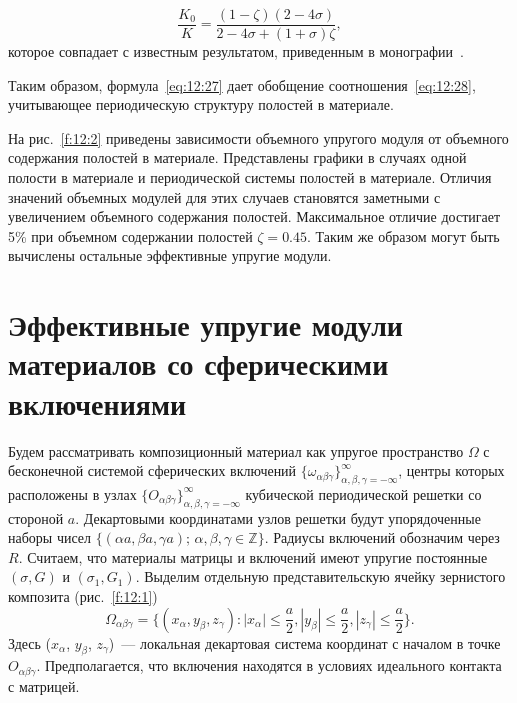 \begin{equation}
\frac{K_0}{K}=\frac{(1-\zeta)(2-4\sigma)}{2-4\sigma+(1+\sigma)\zeta},
\label{eq:12:28}
\end{equation}  
которое совпадает с известным результатом, приведенным в монографии~\cite{Vanin1985}.

Таким образом, формула~\eqref{eq:12:27} дает обобщение соотношения~\eqref{eq:12:28}, учитывающее периодическую структуру полостей в материале.

На рис.~\ref{f:12:2} приведены зависимости объемного упругого модуля от объемного содержания полостей в материале. Представлены графики в случаях одной полости в материале и периодической системы полостей в материале. Отличия значений объемных модулей для этих случаев становятся заметными с увеличением объемного содержания полостей. Максимальное отличие достигает 5\% при объемном содержании полостей $\zeta=0.45$. Таким же образом могут быть вычислены остальные эффективные упругие модули.


\section[Эффективные упругие модули материалов со сферическими включениями]{Эффективные упругие модули материалов со сферическими включениями}

Будем рассматривать композиционный материал как упругое пространство $\Omega$ с бесконечной системой сферических включений $\{\omega_{\alpha\beta\gamma}\}_{\alpha,\beta,\gamma=-\infty}^\infty$, центры которых расположены в узлах $\{O_{\alpha\beta\gamma}\}_{\alpha,\beta,\gamma=-\infty}^\infty$ кубической периодической решетки со стороной $a$. Декартовыми координатами узлов решетки будут упорядоченные наборы чисел $\{(\alpha a,\beta a,\gamma a);\,\alpha,\beta,\gamma\in\mathbb{Z}\}$. Радиусы включений обозначим через $R$. Считаем, что материалы матрицы и включений имеют упругие постоянные $(\sigma, G)$ и $(\sigma_1, G_1)$. Выделим отдельную представительскую ячейку зернистого композита (рис.~\ref{f:12:1})
$$
\Omega_{\alpha\beta\gamma}=\bigg\{(x_\alpha,y_\beta,z_\gamma): |x_\alpha|\le\dfrac{a}{2},|y_\beta|\le\dfrac{a}{2},|z_\gamma|\le\dfrac{a}{2}\bigg\}.
$$
Здесь ($x_\alpha$, $y_\beta$, $z_\gamma$)~--- локальная декартовая система координат с началом в точке $O_{\alpha\beta\gamma}$. Предполагается, что включения находятся в условиях идеального контакта с матрицей.

